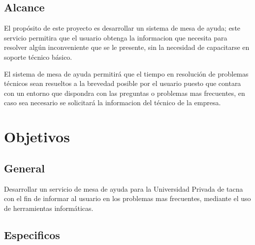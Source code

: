 \documentclass[preprint,12pt]{elsarticle}
\begin{document}

\subsection {\textbf{Alcance}}
El propósito de este proyecto es desarrollar un sistema de mesa de ayuda; este servicio permitira que el usuario obtenga la informacion que necesita para resolver algún inconveniente que se le presente, sin la necesidad de capacitarse en soporte técnico básico.

El sistema de mesa de ayuda permitirá que el tiempo en resolución de problemas técnicos sean resueltos a la brevedad posible por el usuario puesto que contara con un entorno que dispondra con las preguntas o problemas mas frecuentes, en caso sea necesario se solicitará la informacion del técnico de la empresa.



\section{Objetivos}
\begin{figure}[htb]
	\begin{center}
	\end{center}
\end{figure}


\subsection{\textbf{General}}

Desarrollar un servicio de mesa de ayuda para la Universidad Privada de tacna con el fin de informar al usuario en los problemas mas frecuentes, mediante el uso de herramientas informáticas.


\subsection{\textbf{Especificos}}
\end{document}
